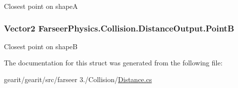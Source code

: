 Closest point on shape\+A 

\hypertarget{struct_farseer_physics_1_1_collision_1_1_distance_output_a90ea5536107ceb77b75fc66b2d954570}{
\subsubsection[{Point\+B}]{\setlength{\rightskip}{0pt plus 5cm}Vector2 Farseer\+Physics.\+Collision.\+Distance\+Output.\+Point\+B}}\label{struct_farseer_physics_1_1_collision_1_1_distance_output_a90ea5536107ceb77b75fc66b2d954570}


Closest point on shape\+B 



The documentation for this struct was generated from the following file\+:\begin{DoxyCompactItemize}
\item 
gearit/gearit/src/farseer 3./\+Collision/\hyperlink{_distance_8cs}{Distance.\+cs}\end{DoxyCompactItemize}
